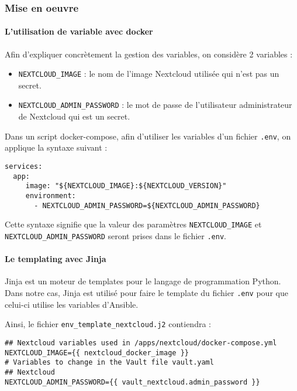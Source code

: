 \subsubsection{Mise en oeuvre}
\paragraph{L'utilisation de variable avec docker}
Afin d'expliquer concrètement la gestion des variables, on considère 2 variables :
\begin{itemize}
    \item \verb|NEXTCLOUD_IMAGE| : le nom de l'image Nextcloud utilisée qui n'est pas un secret.
    \item \verb|NEXTCLOUD_ADMIN_PASSWORD| : le mot de passe de l'utilisateur administrateur de Nextcloud qui est un secret.
\end{itemize}

Dans un script docker-compose, afin d'utiliser les variables d'un fichier \verb|.env|, on applique la syntaxe suivant :
\begin{verbatim}
services:
  app:
     image: "${NEXTCLOUD_IMAGE}:${NEXTCLOUD_VERSION}"
     environment:
       - NEXTCLOUD_ADMIN_PASSWORD=${NEXTCLOUD_ADMIN_PASSWORD}
\end{verbatim}
Cette syntaxe signifie que la valeur des paramètres \verb|NEXTCLOUD_IMAGE| et \verb|NEXTCLOUD_ADMIN_PASSWORD| seront prises dans le fichier \verb|.env|.

\paragraph{Le templating avec Jinja}
Jinja est un moteur de templates pour le langage de programmation Python. Dans notre cas, Jinja est utilisé pour faire le template du fichier \verb|.env| pour que celui-ci utilise les variables d'Ansible.

Ainsi, le fichier \verb|env_template_nextcloud.j2| contiendra :
\begin{verbatim}
## Nextcloud variables used in /apps/nextcloud/docker-compose.yml
NEXTCLOUD_IMAGE={{ nextcloud_docker_image }}
# Variables to change in the Vault file vault.yaml
## Nextcloud
NEXTCLOUD_ADMIN_PASSWORD={{ vault_nextcloud.admin_password }}
\end{verbatim}